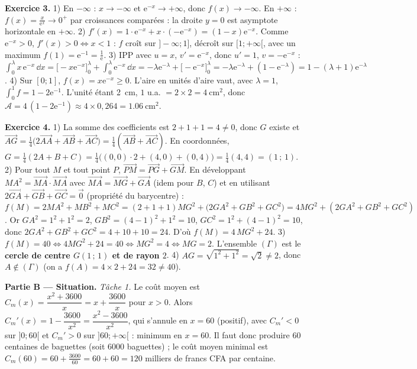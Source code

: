 \noindent\textbf{Exercice 3.}
1) En $-\infty$ : $x\to-\infty$ et $\mathrm{e}^{-x}\to+\infty$, donc $f(x)\to-\infty$.
En $+\infty$ : $f(x)=\frac{x}{\mathrm{e}^{x}}\to0^+$ par croissances comparées : la droite
$y=0$ est asymptote horizontale en $+\infty$.
2) $f'(x)=1\cdot\mathrm{e}^{-x}+x\cdot(-\mathrm{e}^{-x})=(1-x)\mathrm{e}^{-x}$. Comme
$\mathrm{e}^{-x}>0$, $f'(x)>0\iff x<1$ : $f$ croît sur $]-\infty;1]$, décroît sur
$[1;+\infty[$, avec un maximum $f(1)=\mathrm{e}^{-1}=\frac1{\mathrm{e}}$.
3) IPP avec $u=x$, $v'=\mathrm{e}^{-x}$, donc $u'=1$, $v=-\mathrm{e}^{-x}$ :
$\int_0^{\lambda}x\,\mathrm{e}^{-x}\,\dd x=\big[-x\mathrm{e}^{-x}\big]_0^{\lambda}+\int_0^{\lambda}\mathrm{e}^{-x}\,\dd x
=-\lambda\mathrm{e}^{-\lambda}+\big[-\mathrm{e}^{-x}\big]_0^{\lambda}
=-\lambda\mathrm{e}^{-\lambda}+(1-\mathrm{e}^{-\lambda})=1-(\lambda+1)\mathrm{e}^{-\lambda}$.
4) Sur $[0;1]$, $f(x)=x\mathrm{e}^{-x}\ge0$. L'aire en unités d'aire vaut, avec $\lambda=1$,
$\int_0^1 f=1-2\mathrm{e}^{-1}$. L'unité étant \SI{2}{\centi\metre}, $1$ u.a. $=2\times2=\SI{4}{\centi\metre\squared}$,
donc $\mathcal{A}=4\,(1-2\mathrm{e}^{-1})\approx4\times0{,}264=\SI{1,06}{\centi\metre\squared}$.

\noindent\textbf{Exercice 4.}
1) La somme des coefficients est $2+1+1=4\ne0$, donc $G$ existe et
$\overrightarrow{AG}=\frac14\big(2\overrightarrow{AA}+\overrightarrow{AB}+\overrightarrow{AC}\big)
=\frac14(\overrightarrow{AB}+\overrightarrow{AC})$. En coordonnées,
$G=\frac14(2A+B+C)=\frac14\big((0,0)\!\cdot\!2+(4,0)+(0,4)\big)=\frac14(4,4)=(1\,;\,1)$.
2) Pour tout $M$ et tout point $P$, $\overrightarrow{PM}=\overrightarrow{PG}+\overrightarrow{GM}$. En
développant $MA^2=\overrightarrow{MA}\cdot\overrightarrow{MA}$ avec
$\overrightarrow{MA}=\overrightarrow{MG}+\overrightarrow{GA}$ (idem pour $B$, $C$) et en
utilisant $2\overrightarrow{GA}+\overrightarrow{GB}+\overrightarrow{GC}=\vec0$ (propriété du barycentre) :
$f(M)=2MA^2+MB^2+MC^2=(2{+}1{+}1)MG^2+\big(2GA^2+GB^2+GC^2\big)=4MG^2+(2GA^2+GB^2+GC^2)$.
Or $GA^2=1^2+1^2=2$, $GB^2=(4-1)^2+1^2=10$, $GC^2=1^2+(4-1)^2=10$, donc
$2GA^2+GB^2+GC^2=4+10+10=24$. D'où $f(M)=4\,MG^2+24$.
3) $f(M)=40\iff4MG^2+24=40\iff MG^2=4\iff MG=2$. L'ensemble $(\Gamma)$ est le
\textbf{cercle de centre $G(1\,;\,1)$ et de rayon $2$}.
4) $AG=\sqrt{1^2+1^2}=\sqrt2\ne2$, donc $A\notin(\Gamma)$ (on a $f(A)=4\times2+24=32\ne40$).

\smallskip
\noindent\textbf{Partie B — Situation.}
\emph{Tâche 1.} Le coût moyen est $C_m(x)=\dfrac{x^2+3600}{x}=x+\dfrac{3600}{x}$ pour $x>0$.
Alors $C_m'(x)=1-\dfrac{3600}{x^2}=\dfrac{x^2-3600}{x^2}$, qui s'annule en $x=60$ (positif),
avec $C_m'<0$ sur $]0;60[$ et $C_m'>0$ sur $]60;+\infty[$ : minimum en $x=60$. Il faut donc
produire $60$ centaines de baguettes (soit $6000$ baguettes) ; le coût moyen minimal est
$C_m(60)=60+\frac{3600}{60}=60+60=120$ milliers de francs CFA par centaine.

